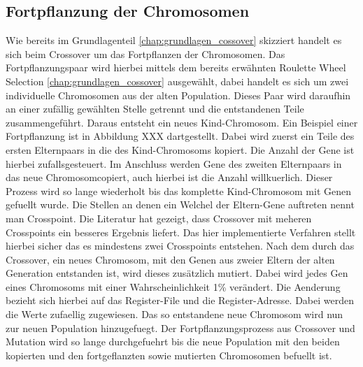 \subsection{Fortpflanzung der Chromosomen}
Wie bereits im Grundlagenteil \ref{chap:grundlagen_cossover} skizziert handelt es sich beim Crossover um das Fortpflanzen der Chromosomen.
Das Fortpflanzungspaar wird hierbei mittels dem bereits erwähnten Roulette Wheel Selection \ref{chap:grundlagen_cossover} ausgewählt, dabei handelt es sich um zwei individuelle Chromosomen aus der alten Population. Dieses Paar wird daraufhin an einer zufällig gewählten Stelle getrennt und die entstandenen Teile zusammengeführt. Daraus entsteht ein neues Kind-Chromosom. Ein Beispiel einer Fortpflanzung ist in Abbildung XXX dartgestellt. Dabei wird zuerst ein Teile des ersten Elternpaars in die des Kind-Chromosoms kopiert. Die Anzahl der Gene ist hierbei zufallsgesteuert. Im Anschluss werden Gene des zweiten Elternpaars in das neue Chromosomcopiert, auch hierbei ist die Anzahl willkuerlich. Dieser Prozess wird so lange wiederholt bis das komplette Kind-Chromosom mit Genen gefuellt wurde.
Die Stellen an denen ein Welchel der Eltern-Gene auftreten nennt man Crosspoint. Die Literatur hat gezeigt, dass Crossover mit meheren Crosspoints ein besseres Ergebnis liefert. Das hier implementierte Verfahren stellt hierbei sicher das es mindestens zwei Crosspoints entstehen.
Nach dem durch das Crossover, ein neues Chromosom, mit den Genen aus zweier Eltern der alten Generation entstanden ist, wird dieses zusätzlich mutiert. Dabei wird jedes Gen eines Chromosoms mit einer Wahrscheinlichkeit 1\% verändert. Die Aenderung bezieht sich hierbei auf das Register-File und die Register-Adresse. Dabei werden die Werte zufaellig zugewiesen.
Das so entstandene neue Chromosom wird nun zur neuen Population hinzugefuegt. Der Fortpflanzungsprozess aus Crossover und Mutation wird so lange durchgefuehrt bis die neue Population mit den beiden kopierten und den fortgeflanzten sowie mutierten Chromosomen befuellt ist.


